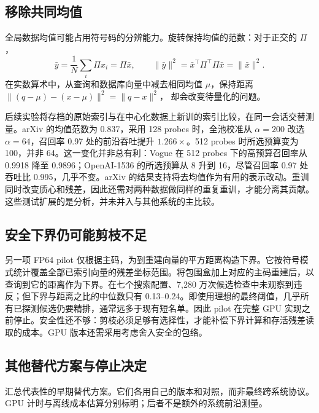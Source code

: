 \subsection{移除共同均值}
\label{sec:8-centring}

全局数据均值可能占用符号码的分辨能力。旋转保持均值的范数：对于正交的 $\Pi$，
\[
 \bar y=\frac1N\sum_i\Pi x_i=\Pi\bar x,
 \qquad \|\bar y\|^2=\bar x^\top\Pi^\top\Pi\bar x=\|\bar x\|^2.
\]
在实数算术中，从查询和数据库向量中减去相同均值 $\mu$，保持距离
$\|(q-\mu)-(x-\mu)\|^2=\|q-x\|^2$，
却会改变待量化的问题。

后续实验将存档的原始索引与在中心化数据上新训的索引比较，在同一会话交替测量。arXiv 的均值范数为 0.837，采用 128 probes 时，全池校准从 $\alpha=200$ 改选 $\alpha=64$，召回率 0.97 处的前沿吞吐提升 $1.266\times$。512 probes 时所选预算变为 100，并非 64。这一变化并非总有利：Vogue 在 512 probes 下的高预算召回率从 0.9918 降至 0.9896；OpenAI-1536 的所选预算从 8 升到 16，尽管召回率 0.97 处吞吐比 0.995，几乎不变。arXiv 的结果支持将去均值作为有用的表示改动。重训同时改变质心和残差，因此还需对两种数据做同样的重复重训，才能分离其贡献。这些测试扩展的是分析，并未并入与其他系统的主比较。

\subsection{安全下界仍可能剪枝不足}
\label{sec:8-residual-bound}

另一项 FP64 pilot 仅根据主码，为到重建向量的平方距离构造下界。它按符号模式统计覆盖全部已索引向量的残差坐标范围。将包围盒加上对应的主码重建后，以查询到它的距离作为下界。在七个搜索配置、7,280 万次候选检查中未观察到违反；但下界与距离之比的中位数只有 0.13--0.24。即使用理想的最终阈值，几乎所有已探测候选仍要精排，通常远多于现有短名单。因此 pilot 在完整 GPU 实现之前停止。安全性还不够：剪枝必须足够有选择性，才能补偿下界计算和存活残差读取的成本。GPU 版本还需采用考虑舍入安全的包络。

\subsection{其他替代方案与停止决定}
\label{sec:8-stopped}

 汇总代表性的早期替代方案。它们各用自己的版本和对照，而非最终跨系统协议。GPU 计时与离线成本估算分别标明；后者不是额外的系统前沿测量。

